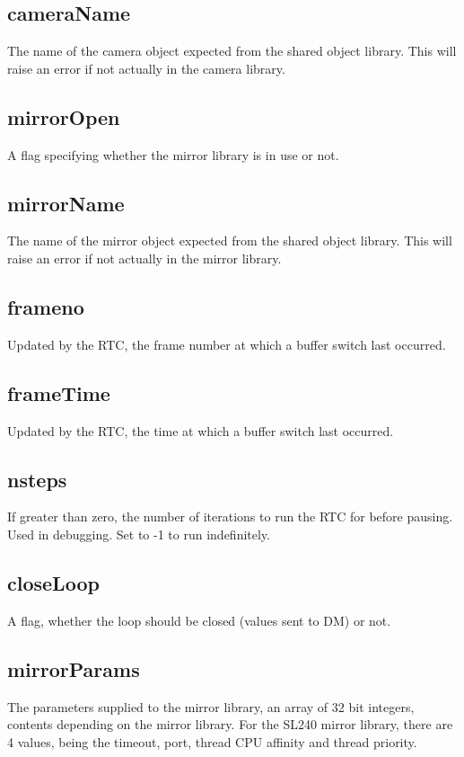 \documentclass[a4,10pt]{article}
\begin{document}
\subsection{cameraName}
The name of the camera object expected from the shared object library.
This will raise an error if not actually in the camera library.

\subsection{mirrorOpen}
A flag specifying whether the mirror library is in use or not.

\subsection{mirrorName}
The name of the mirror object expected from the shared object library.
This will raise an error if not actually in the mirror library.

\subsection{frameno}
Updated by the RTC, the frame number at which a buffer switch last
occurred.

\subsection{frameTime}
Updated by the RTC, the time at which a buffer switch last occurred.

\subsection{nsteps}
If greater than zero, the number of iterations to run the RTC for
before pausing.  Used in debugging.  Set to -1 to run indefinitely.

\subsection{closeLoop}
A flag, whether the loop should be closed (values sent to DM) or not.

\subsection{mirrorParams}
The parameters supplied to the mirror library, an array of 32 bit
integers, contents depending on the mirror library.  For the SL240
mirror library, there are 4 values, being the timeout, port, thread
CPU affinity and thread priority.
\end{document}
